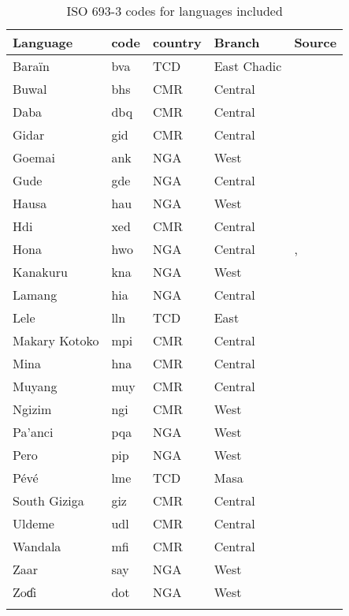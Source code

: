 \documentclass[output=paper,draft,draftmode,colorlinks,citecolor=brown]{langscibook}
\begin{document}
\begin{table}
  \caption{ISO 693-3 codes for languages included}
\begin{tabularx}{\textwidth}{llllQ}
\lsptoprule
Language 	&  code &country	&Branch	&Source\\ %
\midrule
Baraïn		&bva & TCD	&East Chadic    &\citet{lovestrand2021}\\
Buwal 		&bhs & CMR    &Central    &\citet{Viljoen2013}\\
Daba 		&dbq & CMR    &Central    &\citet{LienhardGiger1975}\\
Gidar            &gid & CMR    &Central    &\citet{Frajzyngier2008}\\
Goemai 		&ank & NGA    &West       &\citet{Hellwig2004}\\
Gude		&gde & NGA    &Central    &\citet{Hoskison1983}\\
Hausa 		&hau & NGA    &West       &\citet{Newman2000}\\
Hdi		&xed & CMR       &Central    &\citet{FrajzyngierShay2002}\\
Hona		&hwo & NGA    &Central    &\citet{FrajzyngierXXXX}, \mbox{\citet{FrajzyngierJordanXXXX}}\\
Kanakuru 	&kna & NGA    &West   &\citet{Newman1974}\\
Lamang          &hia & NGA    &Central    &\citet{ekkehard1983}\\
Lele 		&lln & TCD    &East   &\citet{Frajzyngier2001}\\
Makary Kotoko   &mpi & CMR  &Central    &\citet{Allison2020}\\
Mina		&hna & CMR    &Central    &\citet{FrajzyngierJohnston2005}\\
Muyang 		&muy & CMR    &Central    &\citet{SmithGravina2010}\\
Ngizim 		&ngi & CMR    &West       &\citet{Schuh1972}\\
Pa'anci     	&pqa & NGA    &West   &\citet{Skinner1979}\\
Pero 		&pip & NGA    &West   &\citet{Frajzyngier1989}\\
Pévé 		&lme & TCD    &Masa   &\citet{Shay2020}\\
South Giziga	&giz & CMR    &Central    &\citet{Shay2021}\\
Uldeme		&udl & CMR    &Central    &\citet{Kinnaird1998}\\
Wandala		&mfi & CMR    &Central    &\citet{Frajzyngier2012}\\
Zaar		&say & NGA    &West    &\citet{Caron2015}\\
Zoɗi 		&dot & NGA    &West   &\citet{caron2002}\\
\lspbottomrule
\end{tabularx}
\end{table}
\end{document}
